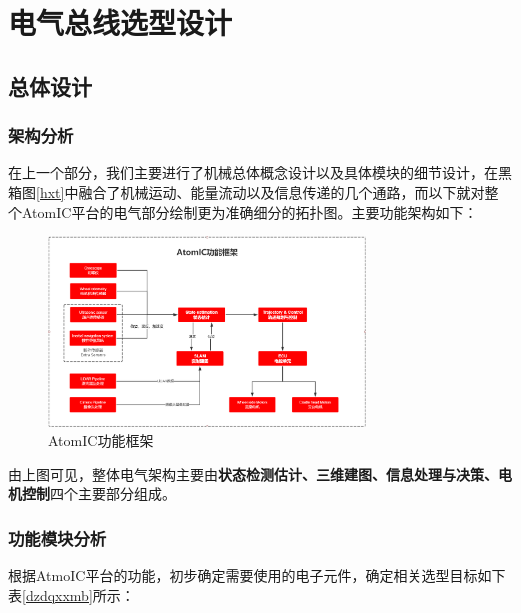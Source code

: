 \newpage
\section{电气总线选型设计}
\subsection{总体设计}
\subsubsection{架构分析}
在上一个部分，我们主要进行了机械总体概念设计以及具体模块的细节设计，在黑箱图\ref{hxt}中融合了机械运动、能量流动以及信息传递的几个通路，而以下就对整个AtomIC平台的电气部分绘制更为准确细分的拓扑图。主要功能架构如下：

\begin{figure}[htbp]
	\centering
	\includegraphics[width = 0.75\textwidth]{fig/rjjg.png}
	\caption{AtomIC功能框架}
	\label{rjjg}
\end{figure}

由上图可见，整体电气架构主要由\textbf{状态检测估计、三维建图、信息处理与决策、电机控制}四个主要部分组成。

\subsubsection{功能模块分析}

根据AtmoIC平台的功能，初步确定需要使用的电子元件，确定相关选型目标如下表\ref{dzdqxxmb}所示：

